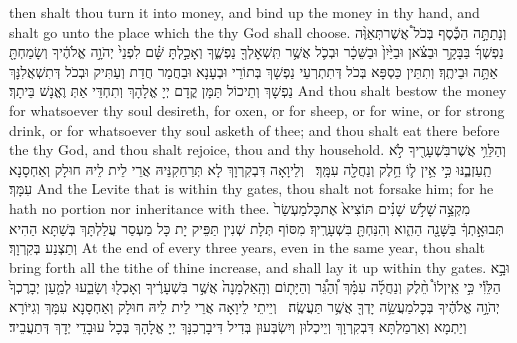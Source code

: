 {then shalt thou turn it into money, and bind up the money in thy hand, and shalt go unto the place which the \lord\space thy God shall choose.}{}
{וְנָתַתָּ֣ה הַכֶּ֡סֶף בְּכֹל֩ אֲשֶׁר\maqqaf תְּאַוֶּ֨ה נַפְשְׁךָ֜ בַּבָּקָ֣ר וּבַצֹּ֗אן וּבַיַּ֙יִן֙ וּבַשֵּׁכָ֔ר וּבְכֹ֛ל אֲשֶׁ֥ר תִּֽשְׁאׇלְךָ֖ נַפְשֶׁ֑ךָ וְאָכַ֣לְתָּ שָּׁ֗ם לִפְנֵי֙ יְהֹוָ֣ה אֱלֹהֶ֔יךָ וְשָׂמַחְתָּ֖ אַתָּ֥ה וּבֵיתֶֽךָ׃}
{וְתִתֵּין כַּסְפָּא בְּכֹל דְּתִתְרְעֵי נַפְשָׁךְ בְּתוֹרֵי וּבְעָנָא וּבַחֲמַר חֲדַת וְעַתִּיק וּבְכֹל דְּתִשְׁאֲלִנָּךְ נַפְשָׁךְ וְתֵיכוֹל תַּמָּן קֳדָם יְיָ אֱלָהָךְ וְתִחְדֵּי אַתְּ וֶאֱנָשׁ בֵּיתָךְ׃}
{And thou shalt bestow the money for whatsoever thy soul desireth, for oxen, or for sheep, or for wine, or for strong drink, or for whatsoever thy soul asketh of thee; and thou shalt eat there before the \lord\space thy God, and thou shalt rejoice, thou and thy household.}{}
{וְהַלֵּוִ֥י אֲשֶׁר\maqqaf בִּשְׁעָרֶ֖יךָ לֹ֣א תַֽעַזְבֶ֑נּוּ כִּ֣י אֵ֥ין ל֛וֹ חֵ֥לֶק וְנַחֲלָ֖ה עִמָּֽךְ׃ \setuma }
{וְלֵיוָאָה דִּבְקִרְוָךְ לָא תְּרַחַקִנֵּיהּ אֲרֵי לֵית לֵיהּ חוּלָק וְאַחְסָנָא עִמָּךְ׃}
{And the Levite that is within thy gates, thou shalt not forsake him; for he hath no portion nor inheritance with thee.}{}
{מִקְצֵ֣ה \legarmeh  שָׁלֹ֣שׁ שָׁנִ֗ים תּוֹצִיא֙ אֶת\maqqaf כׇּל\maqqaf מַעְשַׂר֙ תְּבוּאָ֣תְךָ֔ בַּשָּׁנָ֖ה הַהִ֑וא וְהִנַּחְתָּ֖ בִּשְׁעָרֶֽיךָ׃}
{מִסּוֹף תְּלָת שְׁנִין תַּפֵּיק יָת כָּל מַעְסַר עֲלַלְתָּךְ בְּשַׁתָּא הַהִיא וְתַצְנַע בְּקִרְוָךְ׃}
{At the end of every three years, even in the same year, thou shalt bring forth all the tithe of thine increase, and shall lay it up within thy gates.}{}
{וּבָ֣א הַלֵּוִ֡י כִּ֣י אֵֽין\maqqaf לוֹ֩ חֵ֨לֶק וְנַחֲלָ֜ה עִמָּ֗ךְ וְ֠הַגֵּ֠ר וְהַיָּת֤וֹם וְהָֽאַלְמָנָה֙ אֲשֶׁ֣ר בִּשְׁעָרֶ֔יךָ וְאָכְל֖וּ וְשָׂבֵ֑עוּ לְמַ֤עַן יְבָרֶכְךָ֙ יְהֹוָ֣ה אֱלֹהֶ֔יךָ בְּכׇל\maqqaf מַעֲשֵׂ֥ה יָדְךָ֖ אֲשֶׁ֥ר תַּעֲשֶֽׂה׃ \setuma }
{וְיֵיתֵי לֵיוָאָה אֲרֵי לֵית לֵיהּ חוּלָק וְאַחְסָנָא עִמָּךְ וְגִיּוֹרָא וְיַתְמָא וְאַרְמַלְתָּא דִּבְקִרְוָךְ וְיֵיכְלוּן וְיִשְׂבְּעוּן בְּדִיל דִּיבָרְכִנָּךְ יְיָ אֱלָהָךְ בְּכָל עוּבָדֵי יְדָךְ דְּתַעֲבֵיד׃}
